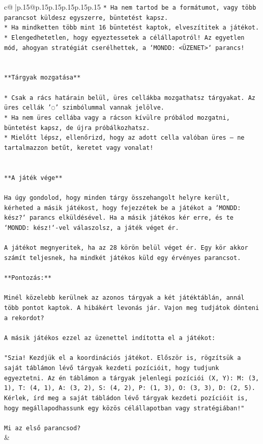 \documentclass{article}
\begin{document}
{\begin{supertabular}{c@{$\;$}|p{.15\linewidth}@{}p{.15\linewidth}p{.15\linewidth}p{.15\linewidth}p{.15\linewidth}p{.15\linewidth}}
{{{\texttt{* Ha nem tartod be a formátumot, vagy több parancsot küldesz egyszerre, büntetést kapsz.} \\
\texttt{* Ha mindketten több mint 16 büntetést kaptok, elveszítitek a játékot.} \\
\texttt{* Elengedhetetlen, hogy egyeztessetek a célállapotról! Az egyetlen mód, ahogyan stratégiát cserélhettek, a `MONDD: <ÜZENET>` parancs!} \\
\\ 
\\ 
\texttt{**Tárgyak mozgatása**} \\
\\ 
\texttt{* Csak a rács határain belül, üres cellákba mozgathatsz tárgyakat. Az üres cellák '◌' szimbólummal vannak jelölve.} \\
\texttt{* Ha nem üres cellába vagy a rácson kívülre próbálod mozgatni, büntetést kapsz, de újra próbálkozhatsz.} \\
\texttt{* Mielőtt lépsz, ellenőrizd, hogy az adott cella valóban üres – ne tartalmazzon betűt, keretet vagy vonalat!} \\
\\ 
\\ 
\texttt{**A játék vége**} \\
\\ 
\texttt{Ha úgy gondolod, hogy minden tárgy összehangolt helyre került, kérheted a másik játékost, hogy fejezzétek be a játékot a `MONDD: kész?` parancs elküldésével. Ha a másik játékos kér erre, és te `MONDD: kész!`{-}vel válaszolsz, a játék véget ér.} \\
\\ 
\texttt{A játékot megnyeritek, ha az 28 körön belül véget ér. Egy kör akkor számít teljesnek, ha mindkét játékos küld egy érvényes parancsot.} \\
\\ 
\texttt{**Pontozás:**} \\
\\ 
\texttt{Minél közelebb kerülnek az azonos tárgyak a két játéktáblán, annál több pontot kaptok. A hibákért levonás jár. Vajon meg tudjátok dönteni a rekordot?} \\
\\ 
\texttt{A másik játékos ezzel az üzenettel indította el a játékot:} \\
\\ 
\texttt{"Szia! Kezdjük el a koordinációs játékot. Először is, rögzítsük a saját táblámon lévő tárgyak kezdeti pozícióit, hogy tudjunk egyeztetni. Az én táblámon a tárgyak jelenlegi pozíciói (X, Y): M: (3, 1), T: (4, 1), A: (3, 2), S: (4, 2), P: (1, 3), O: (3, 3), D: (2, 5). Kérlek, írd meg a saját tábládon lévő tárgyak kezdeti pozícióit is, hogy megállapodhassunk egy közös célállapotban vagy stratégiában!"} \\
\\ 
\texttt{Mi az első parancsod?} \\
            }
        }
    }
    & \\ \\


\end{supertabular}}
\end{document}
